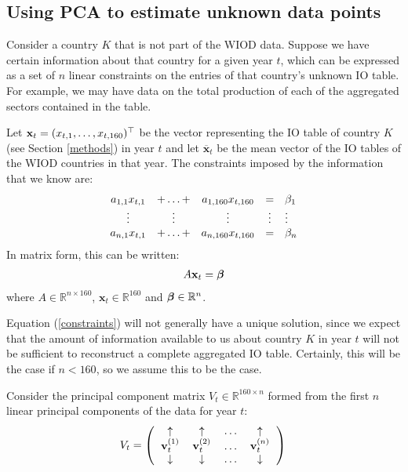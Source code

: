 \documentclass[preprint,authoryear,3p]{elsarticle}
\begin{document}
\subsection{Using PCA to estimate unknown data points} \label{PCAestimation}

Consider a country $K$ that is not part of the WIOD data. Suppose we have certain information about that country for a given year $t$, which can be expressed as a set of $n$ linear constraints on the entries of that country's unknown IO table. For example, we may have data on the total production of each of the aggregated sectors contained in the table.

Let $\textbf{x}_t = (x_{t,1}, \mathellipsis, x_{t,160})^\top$ be the vector representing the IO table of country $K$ (see Section \ref{methods}) in year $t$ and let $\overline{\textbf{x}}_t$ be the mean vector of the IO tables of the WIOD countries in that year. The constraints imposed by the information that we know are:
\begin{align*}
\begin{array}{ccccl}
a_{1,1}x_{t,1} & + \mathellipsis + & a_{1,160}x_{t,160} & = & \beta_1 \\
\vdots & \vdots & \vdots & \vdots & \vdots \\
a_{n,1}x_{t,1} & + \mathellipsis + & a_{n,160}x_{t,160} & = & \beta_n
\end{array}
\end{align*} 
In matrix form, this can be written:
\begin{align} \label{constraints}
A \textbf{x}_t = \mbox{\boldmath$\beta$}
\end{align} 
where $A \in \mathbb{R}^{n \times 160}$, $\textbf{x}_t \in \mathbb{R}^{160}$ and $\mbox{\boldmath$\beta$} \in \mathbb{R}^n$.

Equation (\ref{constraints}) will not generally have a unique solution, since we expect that the amount of information available to us about country $K$ in year $t$ will not be sufficient to reconstruct a complete aggregated IO table. Certainly, this will be the case if $n < 160$, so we assume this to be the case.

Consider the principal component matrix $V_t \in \mathbb{R}^{160 \times n}$ formed from the first $n$ linear principal components of the data for year $t$:
\begin{equation*}
V_t = \left(
\begin{tabular}{cccc}
$\uparrow$ & $\uparrow$ & $\mathellipsis$ & $\uparrow$\\
$\textbf{v}_{t}^{(1)}$ & $\textbf{v}_{t}^{(2)}$ & $\mathellipsis$ & $\textbf{v}_{t}^{(n)}$ \\
$\downarrow$ & $\downarrow$ & $\mathellipsis$ & $\downarrow$
\end{tabular} \right) \\
\end{equation*}
\end{document}
